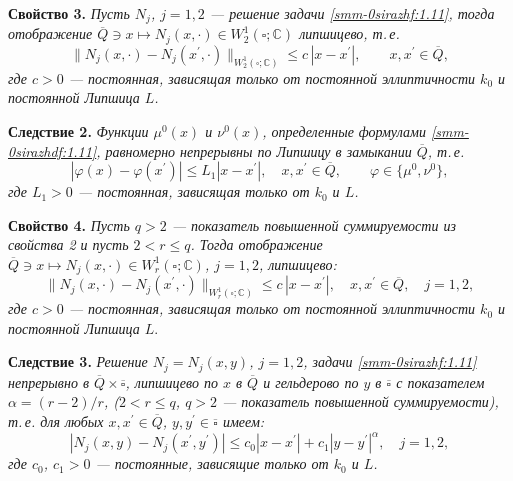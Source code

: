 \documentclass[a4paper,12pt]{article}
\theoremstyle{definition}
\begin{document}
\smallskip
\textbf{Свойство 3.}
\textit{Пусть $N_j$, $j=1,2$ --- решение задачи \eqref{smm-0sirazhf:1.11}, тогда отображение
	$\overline{Q}\ni x \mapsto  N_j(x,\cdot)\in W_2^1(\square;\mathbb{C})$ липшицево, т.\,е.
	\begin{equation}\label{smm-0sirazhdf:1.16}
		\|N_j(x,\cdot)-N_j(x^\prime,\cdot)\|_{W_2^1(\square;\mathbb{C})}\leqslant c\,|x-x^\prime|,
		\qquad x,x^\prime\in\overline{Q},
	\end{equation}
	где $c>0$ --- постоянная, зависящая только от постоянной эллиптичности $k_0$
	и постоянной Липшица $L$.}

\smallskip
\textbf{Следствие 2.}
\textit{Функции $\mu^0 (x)$ и $\nu^0(x)$, определенные формулами \eqref{smm-0sirazhdf:1.11},
	равномерно непрерывны по Липшицу в замыкании $\overline{Q}$, т.\,е.
	\begin{equation*}
		|\varphi(x)-\varphi(x^\prime)|\leqslant L_1|x-x^\prime|,\quad x,x^\prime\in\overline{Q},\qquad
		\varphi\in\{\mu^0,\nu^0\},
	\end{equation*}
	где  $L_1>0$ --- постоянная, зависящая только от $k_0$ и $L$.}


\smallskip
\textbf{Свойство 4.}
\textit{Пусть $q>2$ --- показатель повышенной суммируемости из
	свойства 2  и пусть $2<r\leqslant q$. Тогда отображение $\overline{Q}\ni x \mapsto  N_j(x,\cdot)\in W_r^1(\square;\mathbb{C})$, $j=1,2$,
	липшицево:
	\begin{equation}\label{smm-0sirazhdf:21}
		\|N_j(x,\cdot)-N_j(x^\prime,\cdot)\|_{W_r^1(\square;\mathbb{C})}\leqslant c\,|x-x^\prime|,\quad x,x^\prime\in\overline{Q},\quad
		j=1,2,
	\end{equation}
	где $c>0$ --- постоянная, зависящая только от постоянной эллиптичности $k_0$ и постоянной Липшица $L$}.

\smallskip
\textbf{Следствие 3.}
\textit{Решение $N_j=N_j(x,y)$, $j=1,2$, задачи \eqref{smm-0sirazhf:1.11} непрерывно в $\overline{Q}\times\overline\square$,
	липшицево по $x$ в $\overline{Q}$ и гельдерово по $y$ в $\overline\square$ с показателем $\alpha=(r-2)/r$,
	($2<r\leqslant q$,  $q>2$ --- показатель повышенной суммируемости), т.\,е. для любых
	$x, x^\prime \in \overline{Q}$,  $y, y^\prime \in \overline\square$ имеем:}
\begin{equation}\label{smm-0sirazhdf:1.18}
	|N_j(x,y)-N_j(x^\prime,y^\prime)|\leqslant c_0|x-x^\prime|+c_1|y-y^\prime|^\alpha, \quad j=1,2,
\end{equation}
\textit{где $c_0$, $c_1>0$ --- постоянные, зависящие только от $k_0$ и $L$.}
\end{document}
